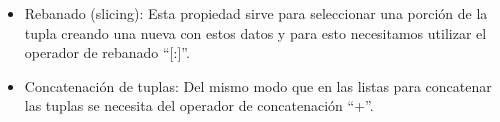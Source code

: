 \begin{itemize}
      \newpage
    \item Rebanado (slicing): Esta propiedad sirve para seleccionar una porción de la tupla creando una nueva con estos datos y para esto necesitamos utilizar el operador de rebanado ``[:]''.
    \begin{figure}[h]
        \centering
      \end{figure}
    
    \item Concatenación de tuplas: Del mismo modo que en las listas para concatenar las tuplas se necesita del operador de concatenación ``+''.
    \begin{figure}[h]
        \centering
      \end{figure}
    

\end{itemize}
